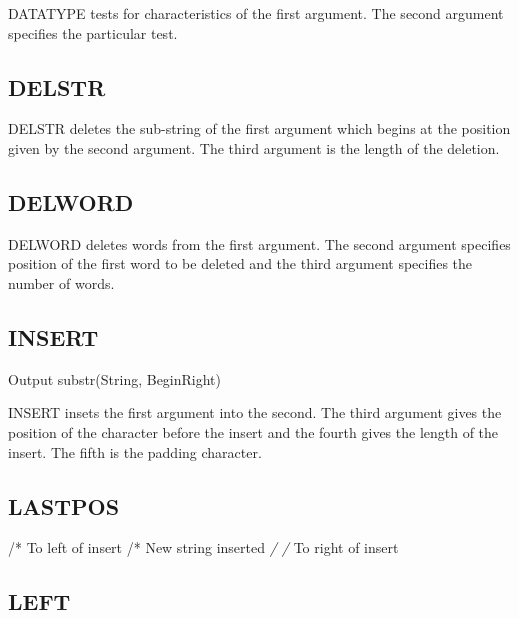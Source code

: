 DATATYPE tests for characteristics of the first argument. The second
argument specifies the particular test.



\subsection{DELSTR}\label{delstr}

DELSTR deletes the sub-string of the first argument which begins at the
position given by the second argument. The third argument is the length
of the deletion.



\subsection{DELWORD}\label{delword}

DELWORD deletes words from the first argument. The second argument
specifies position of the first word to be deleted and the third
argument specifies the number of words.



\subsection{INSERT}\label{insert}

Output \textbar\textbar{} substr(String, BeginRight)

INSERT insets the first argument into the second. The third argument
gives the position of the character before the insert and the fourth
gives the length of the insert. The fifth is the padding character.



\subsection{LASTPOS}\label{lastpos}

/* To left of insert /* New string inserted \emph{/ /} To right of
insert



\subsection{LEFT}\label{left}

